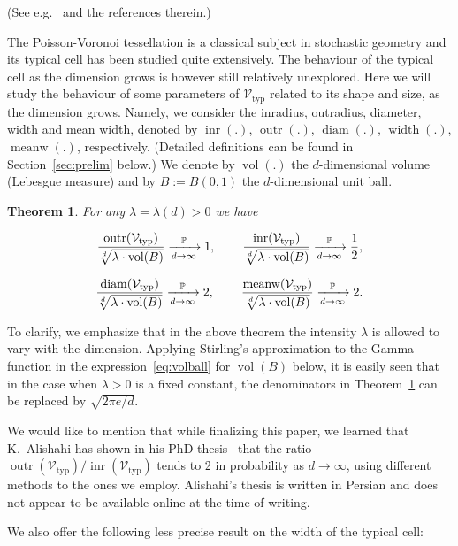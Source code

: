 \documentclass[11pt]{article}%
\newtheorem{theorem}{Theorem} %
\newcommand{\Vcal}[0]{\ensuremath{{\mathcal V}}}
\newcommand{\Pee}[0]{\ensuremath{{\mathbb P}}}
\newcommand{\orig}{\underline{0}}
\DeclareMathOperator{\vol}{vol}
\DeclareMathOperator{\diam}{diam}
\DeclareMathOperator{\inr}{inr}
\DeclareMathOperator{\outr}{outr}
\DeclareMathOperator{\meanw}{meanw}
\DeclareMathOperator{\width}{width}
\newcommand{\Vtyp}[0]{\Vcal_{\text{typ}}}
\begin{document}
\noindent
(See e.g.~\cite{Calkanewpers} and the references therein.)

The Poisson-Voronoi tessellation is a classical subject in stochastic geometry and its typical cell has been studied 
quite extensively. The behaviour of the typical cell as the dimension grows is however still relatively unexplored.
Here we will study the behaviour of some parameters of $\Vtyp$ related to its shape and size, as the dimension grows.
Namely, we consider the inradius, outradius, diameter, width 
and mean width, denoted by $\inr(.)$, $\outr(.)$, $\diam(.)$, $\width(.)$, $\meanw(.)$, respectively.
(Detailed definitions can be found in Section~\ref{sec:prelim} below.)
We denote by $\vol(.)$ the $d$-dimensional volume (Lebesgue measure) and by $B := B(\orig,1)$ the 
$d$-dimensional unit ball.


\begin{theorem}\label{thm:main}
For any $\lambda = \lambda(d)>0$ we have 

$$ \frac{\outr(\Vtyp)}{\sqrt[d]{\lambda\cdot\vol(B)}} \xrightarrow[d\to\infty]{\Pee} 1,
\hspace{5ex} \frac{\inr(\Vtyp)}{\sqrt[d]{\lambda\cdot\vol(B)}} \xrightarrow[d\to\infty]{\Pee} \frac12, $$


$$ \frac{\diam(\Vtyp)}{\sqrt[d]{\lambda\cdot\vol(B)}}  \xrightarrow[d\to\infty]{\Pee} 2, \hspace{5ex} 
\frac{\meanw(\Vtyp)}{\sqrt[d]{\lambda\cdot\vol(B)}} \xrightarrow[d\to\infty]{\Pee} 2. $$

\end{theorem}

\noindent
To clarify, we emphasize that in the above theorem the intensity $\lambda$ is allowed to vary with the dimension.
Applying Stirling's approximation to the Gamma function in the expression~\eqref{eq:volball} for $\vol(B)$ below,
it is easily seen that in the case when $\lambda > 0$ is a fixed constant, the denominators
in Theorem~\ref{thm:main} can be replaced by $\sqrt{2\pi e/ d}$.

We would like to mention that while finalizing this paper, we learned that K.~Alishahi has shown in his PhD 
thesis~\cite{AlishahiThesis}
that the ratio $\outr(\Vtyp)/\inr(\Vtyp)$ tends to 2 in probability as $d\to\infty$, using different methods 
to the ones we employ. Alishahi's thesis is written in Persian and does not appear to 
be available online at the time of writing.

We also offer the following less precise result on the width of the typical cell:
\end{document}
